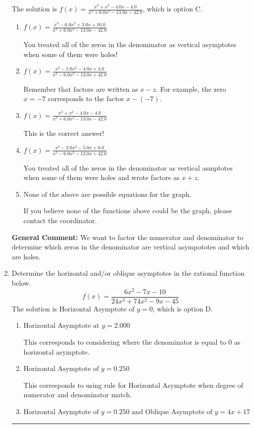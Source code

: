 \documentclass{extbook}[14pt]
\newcommand{\litem}[1]{\item #1

\rule{\textwidth}{0.4pt}}
\begin{document}
\begin{enumerate}
{The solution is \( f(x)=\frac{x^{3} + x^{2} -4.0 x -4.0}{x^{3} +6.0 x^{2} -13.0 x -42.0} \), which is option C.\begin{enumerate}[label=\Alph*.]
\item \( f(x)=\frac{x^{3} -6.0 x^{2} +3.0 x + 10.0}{x^{3} +6.0 x^{2} -13.0 x -42.0} \)

You treated all of the zeros in the denominator as vertical asymptotes when some of them were holes!
\item \( f(x)=\frac{x^{3} -1.0 x^{2} -4.0 x + 4.0}{x^{3} -6.0 x^{2} -13.0 x + 42.0} \)

Remember that factors are written as $x-z$. For example, the zero $x=-7$ corresponds to the factor $x-(-7)$.
\item \( f(x)=\frac{x^{3} + x^{2} -4.0 x -4.0}{x^{3} +6.0 x^{2} -13.0 x -42.0} \)

This is the correct answer!
\item \( f(x)=\frac{x^{3} -2.0 x^{2} -5.0 x + 6.0}{x^{3} -6.0 x^{2} -13.0 x + 42.0} \)

You treated all of the zeros in the denominator as vertical asmptotes when some of them were holes and wrote factors as $x+z$.
\item \( \text{None of the above are possible equations for the graph.} \)

If you believe none of the functions above could be the graph, please contact the coordinator.
\end{enumerate}

\textbf{General Comment:} We want to factor the numerator and denominator to determine which zeros in the denominator are vertical asympototes and which are holes.
}
\litem{
Determine the horizontal and/or oblique asymptotes in the rational function below.
\[ f(x) = \frac{6x^{2} -7 x -10}{24x^{3} +74 x^{2} -9 x -45} \]The solution is \( \text{Horizontal Asymptote of } y = 0 \), which is option D.\begin{enumerate}[label=\Alph*.]
\item \( \text{Horizontal Asymptote at } y = 2.000 \)

This corresponds to considering where the denominator is equal to 0 as horizontal asymptote.
\item \( \text{Horizontal Asymptote of } y = 0.250  \)

This corresponds to using rule for Horizontal Asymptote when degree of numerator and denominator match.
\item \( \text{Horizontal Asymptote of } y = 0.250 \text{ and Oblique Asymptote of } y = 4x + 17 \)


\end{enumerate}}
\end{enumerate}
\end{document}
